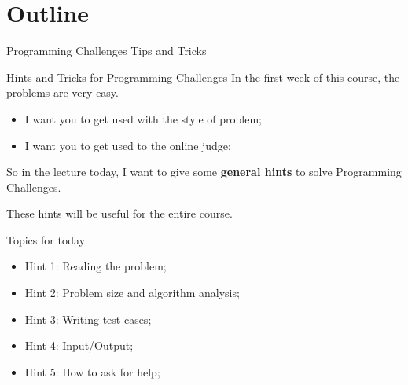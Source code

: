 

\section{Outline}

\begin{frame}
  \centering
  {\huge
    Programming Challenges Tips and Tricks
  }
\end{frame}

\begin{frame}{Hints and Tricks for Programming Challenges}
  In the first week of this course, the problems are very easy.\vfill

  \begin{itemize}
    \item I want you to get used with the style of problem;
    \item I want you to get used to the online judge;
  \end{itemize}\vfill

  So in the lecture today, I want to give some {\bf general hints} to solve Programming Challenges.\bigskip

  These hints will be useful for the entire course.
\end{frame}

\begin{frame}{Topics for today}
  \begin{itemize}
    \item Hint 1: Reading the problem;
    \item Hint 2: Problem size and algorithm analysis;
    \item Hint 3: Writing test cases;
    \item Hint 4: Input/Output;
    \item Hint 5: How to ask for help;
  \end{itemize}
\end{frame}

